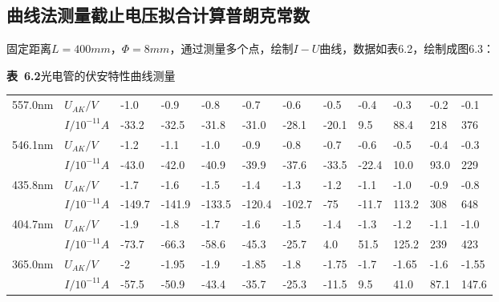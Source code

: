 \documentclass{article}
\def\kong{\hspace*{2em}}
\begin{document}
    \subsection{曲线法测量截止电压拟合计算普朗克常数}
        \kong 固定距离$L=400mm$，$\Phi=8mm$，通过测量多个点，绘制$I-U$曲线，数据如表6.2，绘制成图6.3：\\[12pt]
        \begin{minipage}{1\linewidth}
            \centering
            \textbf{表\ 6.2}\quad 光电管的伏安特性曲线测量  \\[4pt]
            \begin{tabular}{|l|l|l|l|l|l|l|l|l|l|l|l|}
                \hline
                \multirow{2}{*}{557.0nm} & $U_{AK}/V$    & -1.0   & -0.9   & -0.8   & -0.7   & -0.6   & -0.5  & -0.4  & -0.3  & -0.2 & -0.1  \\ \cline{2-12} 
                                         & $I/10^{-11}A$ & -33.2  & -32.5  & -31.8  & -31.0  & -28.1  & -20.1 & 9.5   & 88.4  & 218  & 376   \\ \hline
                \multirow{2}{*}{546.1nm} & $U_{AK}/V$    & -1.2   & -1.1   & -1.0   & -0.9   & -0.8   & -0.7  & -0.6  & -0.5  & -0.4 & -0.3  \\ \cline{2-12} 
                                         & $I/10^{-11}A$ & -43.0  & -42.0  & -40.9  & -39.9  & -37.6  & -33.5 & -22.4 & 10.0  & 93.0 & 229   \\ \hline
                \multirow{2}{*}{435.8nm} & $U_{AK}/V$    & -1.7   & -1.6   & -1.5   & -1.4   & -1.3   & -1.2  & -1.1  & -1.0  & -0.9 & -0.8  \\ \cline{2-12} 
                                         & $I/10^{-11}A$ & -149.7 & -141.9 & -133.5 & -120.4 & -102.7 & -75   & -11.7 & 113.2 & 308  & 648   \\ \hline
                \multirow{2}{*}{404.7nm} & $U_{AK}/V$    & -1.9   & -1.8   & -1.7   & -1.6   & -1.5   & -1.4  & -1.3  & -1.2  & -1.1 & -1.0  \\ \cline{2-12} 
                                         & $I/10^{-11}A$ & -73.7  & -66.3  & -58.6  & -45.3  & -25.7  & 4.0   & 51.5  & 125.2 & 239  & 423   \\ \hline
                \multirow{2}{*}{365.0nm} & $U_{AK}/V$    & -2     & -1.95  & -1.9   & -1.85  & -1.8   & -1.75 & -1.7  & -1.65 & -1.6 & -1.55 \\ \cline{2-12} 
                                         & $I/10^{-11}A$ & -57.5  & -50.9  & -43.4  & -35.7  & -25.3  & -11.5 & 9.5   & 41.0  & 87.1 & 147.6 \\ \hline
            \end{tabular}
        \end{minipage}\\[12pt]
\end{document}
